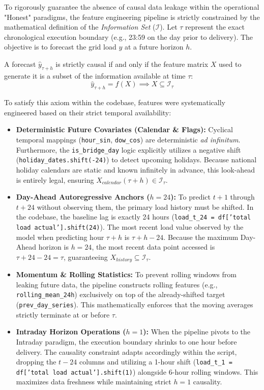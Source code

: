 \documentclass{article}
\begin{document}
To rigorously guarantee the absence of causal data leakage within the operational "Honest" paradigms, the feature engineering pipeline is strictly constrained by the mathematical definition of the \textit{Information Set} ($\mathcal{I}$). Let $\tau$ represent the exact chronological execution boundary (e.g., 23:59 on the day prior to delivery). The objective is to forecast the grid load $y$ at a future horizon $h$.

A forecast $\hat{y}_{\tau+h}$ is strictly causal if and only if the feature matrix $X$ used to generate it is a subset of the information available at time $\tau$:
$$ \hat{y}_{\tau+h} = f(X) \implies X \subseteq \mathcal{I}_{\tau} $$

To satisfy this axiom within the codebase, features were systematically engineered based on their strict temporal availability:
\begin{itemize}
    \item \textbf{Deterministic Future Covariates (Calendar \& Flags):} Cyclical temporal mappings (\texttt{hour\_sin}, \texttt{dow\_cos}) are deterministic \textit{ad infinitum}. Furthermore, the \texttt{is\_bridge\_day} logic explicitly utilizes a negative shift (\texttt{holiday\_dates.shift(-24)}) to detect upcoming holidays. Because national holiday calendars are static and known infinitely in advance, this look-ahead is entirely legal, ensuring $X_{calendar}(\tau+h) \in \mathcal{I}_{\tau}$.
    \item \textbf{Day-Ahead Autoregressive Anchors ($h=24$):} To predict $t+1$ through $t+24$ without observing them, the primary load history must be shifted. In the codebase, the baseline lag is exactly 24 hours (\texttt{load\_t\_24 = df['total load actual'].shift(24)}). The most recent load value observed by the model when predicting hour $\tau+h$ is $\tau+h-24$. Because the maximum Day-Ahead horizon is $h=24$, the most recent data point accessed is $\tau+24-24 = \tau$, guaranteeing $X_{history} \subseteq \mathcal{I}_{\tau}$.
    \item \textbf{Momentum \& Rolling Statistics:} To prevent rolling windows from leaking future data, the pipeline constructs rolling features (e.g., \texttt{rolling\_mean\_24h}) exclusively on top of the already-shifted target (\texttt{prev\_day\_series}). This mathematically enforces that the moving averages strictly terminate at or before $\tau$.
    \item \textbf{Intraday Horizon Operations ($h=1$):} When the pipeline pivots to the Intraday paradigm, the execution boundary shrinks to one hour before delivery. The causality constraint adapts accordingly within the script, dropping the $t-24$ columns and utilizing a 1-hour shift (\texttt{load\_t\_1 = df['total load actual'].shift(1)}) alongside 6-hour rolling windows. This maximizes data freshness while maintaining strict $h=1$ causality.
\end{itemize}
\end{document}

